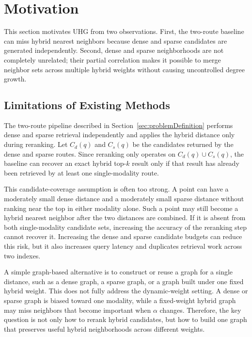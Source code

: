 \section{Motivation}
\label{sec:solution1}

This section motivates UHG from two observations. First, the two-route baseline can miss hybrid nearest neighbors because dense and sparse candidates are generated independently. Second, dense and sparse neighborhoods are not completely unrelated; their partial correlation makes it possible to merge neighbor sets across multiple hybrid weights without causing uncontrolled degree growth.

\subsection{Limitations of Existing Methods}

The two-route pipeline described in Section~\ref{sec:problemDefinition} performs dense and sparse retrieval independently and applies the hybrid distance only during reranking. Let $C_d(q)$ and $C_s(q)$ be the candidates returned by the dense and sparse routes. Since reranking only operates on $C_d(q)\cup C_s(q)$, the baseline can recover an exact hybrid top-$k$ result only if that result has already been retrieved by at least one single-modality route.

This candidate-coverage assumption is often too strong. A point can have a moderately small dense distance and a moderately small sparse distance without ranking near the top in either modality alone. Such a point may still become a hybrid nearest neighbor after the two distances are combined. If it is absent from both single-modality candidate sets, increasing the accuracy of the reranking step cannot recover it. Increasing the dense and sparse candidate budgets can reduce this risk, but it also increases query latency and duplicates retrieval work across two indexes.

A simple graph-based alternative is to construct or reuse a graph for a single distance, such as a dense graph, a sparse graph, or a graph built under one fixed hybrid weight. This does not fully address the dynamic-weight setting. A dense or sparse graph is biased toward one modality, while a fixed-weight hybrid graph may miss neighbors that become important when $\alpha$ changes. Therefore, the key question is not only how to rerank hybrid candidates, but how to build one graph that preserves useful hybrid neighborhoods across different weights.

